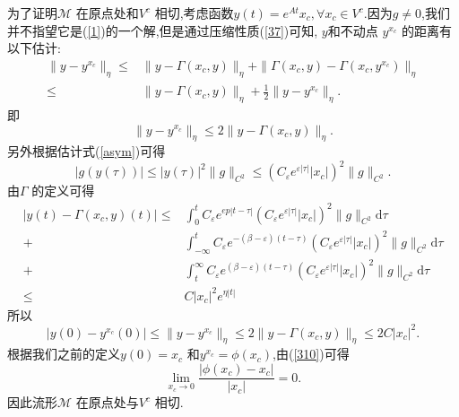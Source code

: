 为了证明$\mathcal{M}$ 在原点处和$V^{c}$ 相切,考虑函数$y(t)=e^{At}x_c,\forall x_c\in V^{c}$.因为$g\neq 0$,我们并不指望它是(\ref{1})的一个解,但是通过压缩性质(\ref{37})可知, $y$和不动点 $y^{x_c}$ 的距离有以下估计:
\begin{equation}
  \begin{aligned}
    \|y-y^{x_c}\|_{\eta}\le &\|y-\Gamma(x_c,y)\|_\eta+\|\Gamma(x_c,y)-\Gamma(x_c,y^{x_c})\|_{\eta}\\
    \le  & \|y-\Gamma(x_c,y)\|_\eta+\frac{1}{2}\|y-y^{x_c}\|_\eta.
  \end{aligned}
\end{equation}
即
\begin{equation}
  \|y-y^{x_c}\|_\eta\le 2\|y-\Gamma(x_c,y)\|_\eta.
\end{equation}
另外根据估计式(\ref{asym})可得
\[
  \left| g(y(\tau)) \right| \le \left| y(\tau) \right| ^{2}\|g\|_{C^{2}}\le \left( C_\varepsilon e^{\varepsilon \left| \tau \right| }\left| x_c \right|  \right) ^2\|g\|_{C^{2}}.
\] 
由$\Gamma$ 的定义可得
\begin{equation}
  \begin{aligned}
    \left| y(t)-\Gamma(x_c,y)(t) \right| \le & \int_0^{t}C_\varepsilon e^{ep\left| t-\tau \right| }\left( C_\varepsilon e^{\varepsilon \left| \tau \right| }\left| x_c \right|  \right) ^2\|g\|_{C^2}\mathrm{d}\tau\\
    +& \int_{-\infty}^{t}C_\varepsilon  e^{-(\beta-\varepsilon)(t-\tau) }\left( C_\varepsilon e^{\varepsilon \left| \tau \right| }\left| x_c \right|  \right) ^2\|g\|_{C^{2}}\mathrm{d}\tau\\
    +& \int_t ^{\infty}C_\varepsilon e^{(\beta-\varepsilon )(t-\tau)}\left( C_\varepsilon e^{\varepsilon \left| \tau \right| }\left| x_c \right|  \right) ^2\|g\|_{C^{2}}\mathrm{d}\tau\\
    \le &C\left| x_c \right| ^2e^{\eta\left| t \right| }
  \end{aligned}
\end{equation}
所以
\begin{equation}
  \left| y(0)-y^{x_c}(0) \right| \le \|y-y^{x_c}\|_{\eta}\le 2\|y-\Gamma(x_c,y)\|_{\eta}\le 2C\left| x_c \right| ^2.\label{310}
\end{equation}
根据我们之前的定义$y(0)=x_c$ 和$y^{x_c}=\phi(x_c)$,由(\ref{310})可得
\[
  \lim_{x_c \to 0} \frac{\left| \phi(x_c)-x_c \right| }{\left| x_c \right| }=0.
\] 
因此流形$\mathcal{M}$ 在原点处与$V^{c}$ 相切.
